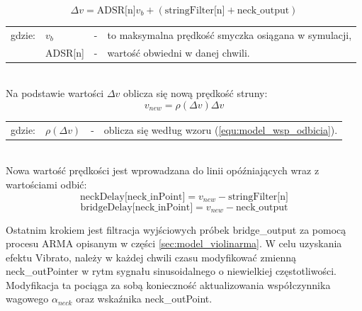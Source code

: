  \begin{equation} \label{equ:model_deltav}
\Delta v = \text{ADSR[n]} v_b + (\text{stringFilter[n]} + \text{neck\_output})
\end{equation}
\begin{tabular}{ l l l l}
	gdzie: & $v_b$ &  - & to maksymalna prędkość smyczka osiągana w symulacji, \\
	& ADSR[n] &  - & wartość obwiedni w danej chwili. \\
\end{tabular} \\
Na podstawie wartości $\Delta v$ oblicza się nową prędkość struny:
 \begin{equation} \label{equ:model_newv}
v_{new} = \rho (\Delta v) \Delta v
\end{equation}
\begin{tabular}{ l l l l}
	gdzie: & $\rho (\Delta v)$ &  - & oblicza się według wzoru (\ref{equ:model_wsp_odbicia}). \\
\end{tabular} \\
Nowa wartość prędkości jest wprowadzana do linii opóźniających wraz z wartościami odbić:
 \begin{equation} \label{equ:model_newv2}
\text{neckDelay[neck\_inPoint]} = v_{new} - \text{stringFilter[n]}
\end{equation}
 \begin{equation} \label{equ:model_newv3}
\text{bridgeDelay[neck\_inPoint]} = v_{new} - \text{neck\_output}
\end{equation}

Ostatnim krokiem jest filtracja wyjściowych próbek bridge\_output za pomocą procesu ARMA opisanym w części \ref{sec:model_violinarma}.
W celu uzyskania efektu Vibrato, należy w każdej chwili czasu modyfikować zmienną neck\_outPointer w rytm sygnału sinusoidalnego o niewielkiej częstotliwości. Modyfikacja ta pociąga za sobą konieczność aktualizowania współczynnika wagowego $\alpha _{neck}$ oraz wskaźnika neck\_outPoint. 
